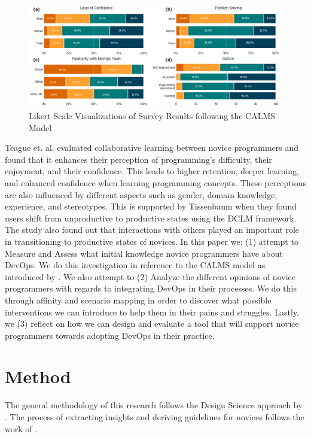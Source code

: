\documentclass{sigchi}
\begin{document}
\begin{figure}[tp]
\centering
 \includegraphics[width=1.75\columnwidth]{figures/Figure_Combined.png}
    \caption{Likert Scale Visualizations of Survey Results following the CALMS Model}\label{fig:likerts}
\end{figure}

Teague et. al. \cite{teague2008collaborative} evaluated collaborative learning between novice programmers and found that it enhances their perception of programming's difficulty, their enjoyment, and their confidence. This leads to higher retention, deeper learning, and enhanced confidence when learning programming concepts. These perceptions are also influenced by different aspects such as gender, domain knowledge, experience, and stereotypes. This is supported by Tissenbaum \cite{tissenbaum2020see} when they found users shift from unproductive to productive states using the DCLM framework. The study also found out that interactions with others played an important role in transitioning to productive states of novices. In this paper we: (1) attempt to Measure and Assess what initial knowledge novice programmers have about DevOps. We do this investigation in reference to the CALMS model as introduced by \cite{riley2014keep}. We also attempt to (2) Analyze the different opinions of novice programmers with regards to integrating DevOps in their processes. We do this through affinity and scenario mapping in order to discover what possible interventions we can introduce to help them in their pains and struggles. Lastly, we (3) reflect on how we can design and evaluate a tool that will support novice programmers towards adopting DevOps in their practice.

\section{Method}
The general methodology of this research follows the Design Science approach by \cite{peffers2007design}. The process of extracting insights and deriving guidelines for novices follows the work of \cite{nodalo2019building}. 
\end{document}
